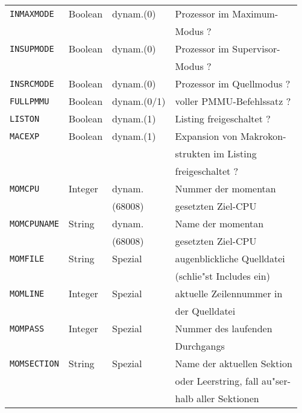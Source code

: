 \documentclass[12pt,a4paper,twoside]{report}
\newcommand{\tty}[1]{{\tt #1}}
\begin{document}
\begin{center}
\begin{longtable}{|l|l|l|l|}
\hline
\tty{INMAXMODE}  &  Boolean    & dynam.(0)  & Prozessor im Maximum- \\
                 &             &            & Modus ? \\
\hline
\tty{INSUPMODE}  &  Boolean    & dynam.(0)  & Prozessor im Supervisor- \\
                 &             &            & Modus ? \\
\hline
\tty{INSRCMODE}  &  Boolean    & dynam.(0)  & Prozessor im Quellmodus ? \\
\hline
\tty{FULLPMMU}   &  Boolean    & dynam.(0/1) & voller PMMU-Befehlssatz ? \\
\hline
\tty{LISTON}     &  Boolean    & dynam.(1)  & Listing freigeschaltet ? \\
\hline
\tty{MACEXP}     &  Boolean    & dynam.(1)  & Expansion von Makrokon- \\
                 &             &            & strukten im Listing \\
                 &             &            & freigeschaltet ? \\
\hline
\tty{MOMCPU}     &  Integer    & dynam.     & Nummer der momentan \\
                 &             & (68008)    & gesetzten Ziel-CPU \\
\hline
\tty{MOMCPUNAME} &  String     & dynam.     & Name der momentan \\
                 &             & (68008)    & gesetzten Ziel-CPU \\
\hline
\tty{MOMFILE}    &  String     & Spezial    & augenblickliche Quelldatei \\
                 &             &            & (schlie"st Includes ein) \\
\hline
\tty{MOMLINE}    &  Integer    & Spezial    & aktuelle Zeilennummer in \\
                 &             &            & der Quelldatei \\
\hline
\tty{MOMPASS}    &  Integer    & Spezial    & Nummer des laufenden \\
                 &             &            & Durchgangs \\
\hline
\tty{MOMSECTION} &  String     & Spezial    & Name der aktuellen Sektion \\
                 &             &            & oder Leerstring, fall au"ser- \\
                 &             &            & halb aller Sektionen \\

\end{longtable}
\end{center}
\end{document}
